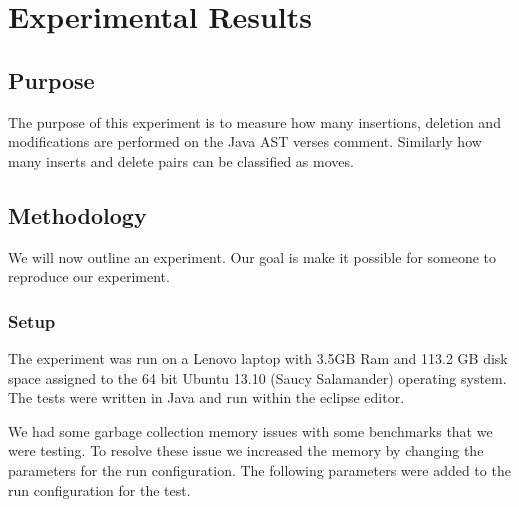 
\chapter{Experimental Results}

\section{Purpose}
The purpose of this experiment is to measure how many insertions, deletion and modifications are performed on the Java AST verses comment. Similarly how many inserts and delete pairs can be classified as moves. 


\section{Methodology}
We will now outline an experiment. Our goal is make it possible for someone to reproduce our experiment.

\subsection{Setup}

The experiment was run on a Lenovo laptop with 3.5GB Ram and 113.2 GB disk space assigned to the 64 bit Ubuntu 13.10 (Saucy Salamander) operating system. The tests were written in Java and run within the eclipse editor.

  

We had some garbage collection memory issues with some benchmarks that we were testing. To resolve these issue we increased the memory by changing the parameters for the run configuration.  The following parameters were added to the run configuration for the test.

